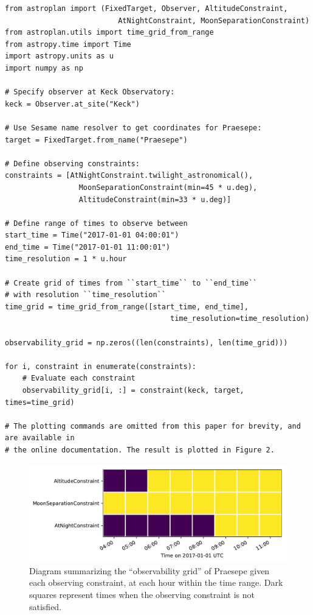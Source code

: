 \begin{subappendices}
\begin{lstlisting}
from astroplan import (FixedTarget, Observer, AltitudeConstraint,
                          AtNightConstraint, MoonSeparationConstraint)
from astroplan.utils import time_grid_from_range
from astropy.time import Time
import astropy.units as u
import numpy as np

# Specify observer at Keck Observatory:
keck = Observer.at_site("Keck")

# Use Sesame name resolver to get coordinates for Praesepe:
target = FixedTarget.from_name("Praesepe")

# Define observing constraints:
constraints = [AtNightConstraint.twilight_astronomical(),
                 MoonSeparationConstraint(min=45 * u.deg),
                 AltitudeConstraint(min=33 * u.deg)]

# Define range of times to observe between
start_time = Time("2017-01-01 04:00:01")
end_time = Time("2017-01-01 11:00:01")
time_resolution = 1 * u.hour

# Create grid of times from ``start_time`` to ``end_time``
# with resolution ``time_resolution``
time_grid = time_grid_from_range([start_time, end_time],
                                      time_resolution=time_resolution)

observability_grid = np.zeros((len(constraints), len(time_grid)))

for i, constraint in enumerate(constraints):
    # Evaluate each constraint
    observability_grid[i, :] = constraint(keck, target, times=time_grid)
    
# The plotting commands are omitted from this paper for brevity, and are available in 
# the online documentation. The result is plotted in Figure 2.
\end{lstlisting}

\begin{figure}[h]
\centering
\includegraphics[scale=0.7]{astroplan/constraints.pdf}
\caption{Diagram summarizing the ``observability grid'' of Praesepe given each observing constraint, at each hour within the time range. Dark squares represent times when the observing constraint is not satisfied.}
\label{fig:constraints}
\end{figure}


\end{subappendices}
